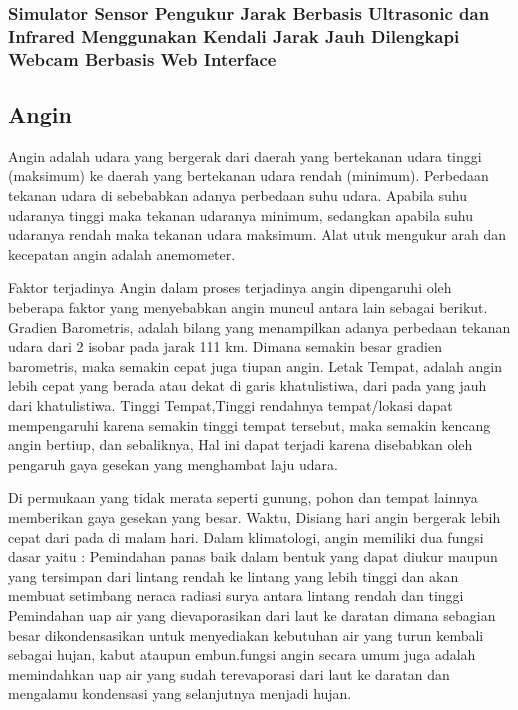 \subsubsection{Simulator Sensor Pengukur Jarak Berbasis Ultrasonic dan Infrared Menggunakan Kendali Jarak Jauh Dilengkapi Webcam Berbasis Web 
Interface}



\subsection{Angin}

Angin adalah udara yang bergerak dari daerah yang bertekanan udara tinggi (maksimum) ke daerah yang bertekanan udara rendah (minimum). Perbedaan 
tekanan udara di sebebabkan adanya perbedaan suhu udara. Apabila suhu udaranya tinggi maka tekanan udaranya minimum, sedangkan apabila suhu udaranya 
rendah maka tekanan udara maksimum. Alat utuk mengukur arah dan kecepatan angin adalah anemometer.

Faktor terjadinya Angin dalam proses terjadinya angin dipengaruhi oleh beberapa faktor yang menyebabkan angin muncul antara lain sebagai berikut. 
Gradien Barometris, adalah bilang yang menampilkan adanya perbedaan tekanan udara dari 2 isobar pada jarak 111 km. Dimana semakin besar gradien 
barometris, maka semakin cepat juga tiupan angin. Letak Tempat, adalah angin lebih cepat yang berada atau dekat di garis khatulistiwa, dari pada yang 
jauh dari khatulistiwa. Tinggi Tempat,Tinggi rendahnya tempat/lokasi dapat mempengaruhi karena semakin tinggi tempat tersebut, maka semakin kencang 
angin bertiup, dan sebaliknya, Hal ini dapat terjadi karena disebabkan oleh pengaruh gaya gesekan yang menghambat laju udara.

Di permukaan yang tidak merata seperti gunung, pohon dan tempat lainnya memberikan gaya gesekan yang besar. Waktu, Disiang hari angin bergerak lebih 
cepat dari pada di malam hari. Dalam klimatologi, angin memiliki dua fungsi dasar yaitu : Pemindahan panas baik dalam bentuk yang dapat diukur maupun 
yang tersimpan dari lintang rendah ke lintang yang lebih tinggi dan akan membuat setimbang neraca radiasi surya antara lintang rendah dan tinggi 
Pemindahan uap air yang dievaporasikan dari laut ke daratan dimana sebagian besar dikondensasikan untuk menyediakan kebutuhan air yang turun kembali 
sebagai hujan, kabut ataupun embun.fungsi angin secara umum juga adalah memindahkan uap air yang sudah terevaporasi dari laut ke daratan dan mengalamu 
kondensasi yang selanjutnya menjadi hujan.

